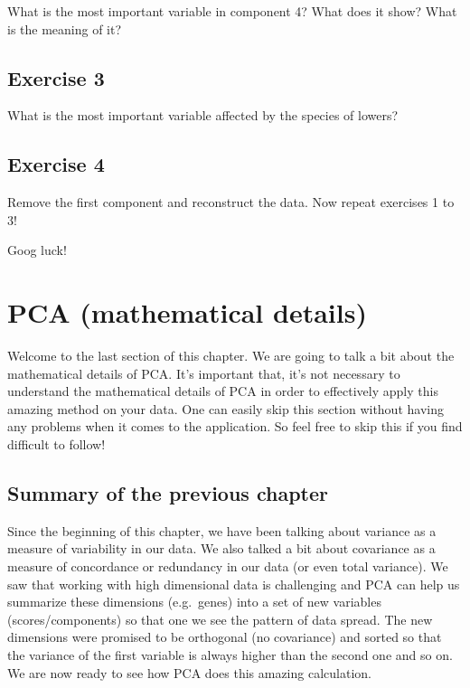\documentclass[
]{book}
\theoremstyle{definition}
\theoremstyle{definition}
\theoremstyle{definition}
\theoremstyle{remark}
\begin{document}
What is the most important variable in component 4? What does it show? What is the meaning of it?

\hypertarget{exercise-3}{%
\section{Exercise 3}\label{exercise-3}}

What is the most important variable affected by the species of lowers?

\hypertarget{exercise-4}{%
\section{Exercise 4}\label{exercise-4}}

Remove the first component and reconstruct the data. Now repeat exercises 1 to 3!

Goog luck!

\hypertarget{pcamath}{%
\chapter{PCA (mathematical details)}\label{pcamath}}

Welcome to the last section of this chapter. We are going to talk a bit about the mathematical details of PCA. It's important that, it's not necessary to understand the mathematical details of PCA in order to effectively apply this amazing method on your data. One can easily skip this section without having any problems when it comes to the application. So feel free to skip this if you find difficult to follow!

\hypertarget{summary-of-the-previous-chapter-2}{%
\section{Summary of the previous chapter}\label{summary-of-the-previous-chapter-2}}

Since the beginning of this chapter, we have been talking about variance as a measure of variability in our data. We also talked a bit about covariance as a measure of concordance or redundancy in our data (or even total variance). We saw that working with high dimensional data is challenging and PCA can help us summarize these dimensions (e.g.~genes) into a set of new variables (scores/components) so that one we see the pattern of data spread. The new dimensions were promised to be orthogonal (no covariance) and sorted so that the variance of the first variable is always higher than the second one and so on. We are now ready to see how PCA does this amazing calculation.
\end{document}
